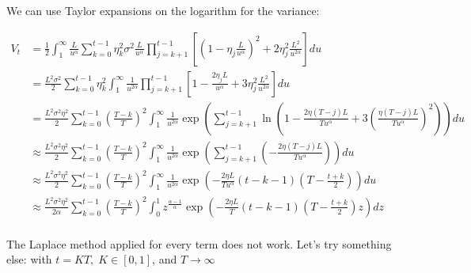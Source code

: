 \documentclass{article}
\begin{document}



We can use Taylor expansions on the logarithm for the variance:

\begin{align*}
V_t &= \frac{1}{2} \int_1^\infty \frac{L}{u^\alpha} \sum_{k=0}^{t-1} \eta_k^2 \sigma^2 \frac{L}{u^\alpha} \prod_{j=k+1}^{t-1} \left[ \left(1-\eta_j\frac{L}{u^\alpha}\right)^2+2\eta_j^2 \frac{L^2}{u^{2\alpha}}\right]du\\
&= \frac{L^2 \sigma^2}{2} \sum_{k=0}^{t-1} \eta_k^2 \int_1^\infty \frac{1}{u^{2\alpha}} \prod_{j=k+1}^{t-1} \left[ 1 - \frac{2\eta_j L}{u^\alpha} + 3\eta_j^2 \frac{L^2}{u^{2\alpha}} \right]du\\
&= \frac{L^2 \sigma^2 \eta^2}{2} \sum_{k=0}^{t-1} \left(\frac{T-k}{T}\right)^2 \int_1^\infty \frac{1}{u^{2\alpha}} \exp\left( \sum_{j=k+1}^{t-1} \ln\left( 1- \tfrac{2\eta(T-j)L}{T u^\alpha}   +  3 ( \tfrac{\eta(T-j)L}{T u^\alpha})^2\right) \right)du\\
&
\approx \frac{L^2 \sigma^2 \eta^2}{2} \sum_{k=0}^{t-1} \left(\frac{T-k}{T}\right)^2 \int_1^\infty \frac{1}{u^{2\alpha}} \exp\left( \sum_{j=k+1}^{t-1} \left( - \frac{2\eta(T-j)L}{T u^\alpha}\right) \right)du\\
&\approx \frac{L^2 \sigma^2 \eta^2}{2} \sum_{k=0}^{t-1} \left(\frac{T-k}{T}\right)^2 \int_1^\infty \frac{1}{u^{2\alpha}} \exp\left( - \frac{2\eta L}{T u^\alpha} (t-k-1)\left(T - \frac{t+k}{2}\right) \right) du\\
&\approx \frac{L^2 \sigma^2 \eta^2}{2\alpha} \sum_{k=0}^{t-1} \left(\frac{T-k}{T}\right)^2 \int_0^1 z^{\frac{\alpha-1}{\alpha}} \exp\left( - \frac{2\eta L}{T} (t-k-1)\left(T - \frac{t+k}{2}\right) z \right)  dz\\
\end{align*}

The Laplace method applied for every term does not work.
Let's try something else: with $t = KT, \;K\in [0,1]$, and $T\to \infty$
\end{document}
